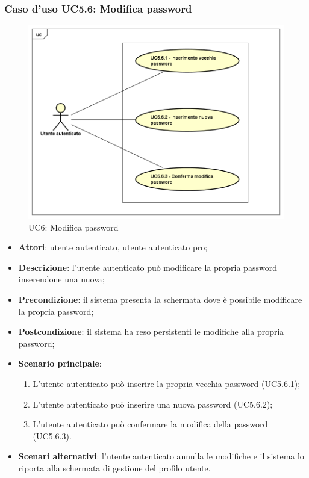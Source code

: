 \subsubsection{Caso d'uso UC5.6: Modifica password}
\label{UC5.6}
\begin{figure}[h]
	\centering
	\includegraphics[scale=0.5,keepaspectratio]{UML/UC5_6.png}
	\caption{UC6: Modifica password}
\end{figure}

\begin{itemize}
	\item \textbf{Attori}: utente autenticato, utente autenticato pro;
	\item \textbf{Descrizione}: l'utente autenticato può modificare la propria password inserendone una nuova;
	\item \textbf{Precondizione}: il sistema presenta la schermata dove è possibile modificare la propria password;
	\item \textbf{Postcondizione}: il sistema ha reso persistenti le modifiche alla propria password;
	\item \textbf{Scenario principale}:
	\begin{enumerate}
		\item L'utente autenticato può inserire la propria vecchia password (UC5.6.1);
		\item L'utente autenticato può inserire una nuova password (UC5.6.2);
		\item L'utente autenticato può confermare la modifica della password (UC5.6.3).
	\end{enumerate}
	\item \textbf{Scenari alternativi}: l'utente autenticato annulla le modifiche e il sistema lo riporta alla schermata di gestione del profilo utente.
\end{itemize}

